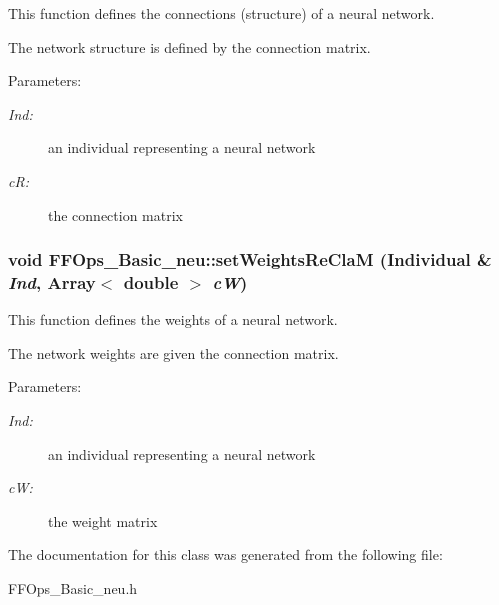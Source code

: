 This function defines the connections (structure) of a neural network.

The network structure is defined by the connection matrix. \begin{Desc}
\item[Parameters: ]\par
\begin{description}
\item[{\em 
Ind:}]an individual representing a neural network \item[{\em 
c\-R:}]the connection matrix \end{description}
\end{Desc}
\subsubsection{\setlength{\rightskip}{0pt plus 5cm}void FFOps\_\-Basic\_\-neu::set\-Weights\-Re\-Cla\-M (Individual \& {\em Ind}, Array$<$ double $>$ {\em c\-W})}\label{classFFOps__Basic__neu_a5}


This function defines the weights of a neural network.

The network weights are given the connection matrix. \begin{Desc}
\item[Parameters: ]\par
\begin{description}
\item[{\em 
Ind:}]an individual representing a neural network \item[{\em 
c\-W:}]the weight matrix \end{description}
\end{Desc}


The documentation for this class was generated from the following file:\begin{CompactItemize}
\item 
FFOps\_\-Basic\_\-neu.h\end{CompactItemize}
